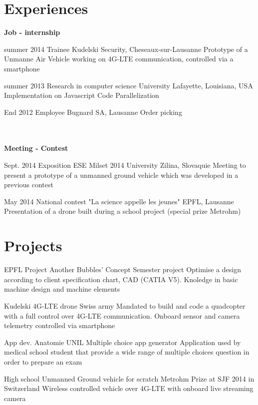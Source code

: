 \documentclass[]{friggeri-cv}
\begin{document}
	\section{Experiences}
	
	\textbf{Job - internship}%
	
	\begin{entrylist}
		
		\entry
		{summer 2014}
		{Trainee}
		{Kudelski Security, Cheseaux-sur-Lausanne}
		{Prototype of a Unmanne Air Vehicle working on 4G-LTE communication, controlled via a smartphone}
		
		\entry
		{summer 2013}
		{Research in computer science}
		{University Lafayette, Louisiana, USA}
		{Implementation on Javascript Code Parallelization}
		
		\entry
		{End 2012}
		{Employee}
		{Bugnard SA, Lausanne}
		{Order picking}
		
	\end{entrylist}
	\\ \\
	\textbf{Meeting - Contest} %
	
	\begin{entrylist}
		
		\entry
		{Sept. 2014}
		{Exposition ESE Milset 2014}
		{University Zilina, Slovaquie}
		{Meeting to present a prototype of a unmanned ground vehicle which was developed in a previous contest}
		
		\entry
		{May 2014}
		{National contest "La science appelle les jeunes"}
		{EPFL, Lausanne}
		{Presentation of a drone built during a school project (special prize Metrohm)}

	\end{entrylist}	
	\section{Projects}
	\begin{entrylist}
		\entry
		{EPFL Project}
		{Another Bubbles' Concept}
		{Semester project}
		{Optimise a design according to client specification chart, CAD (CATIA V5). Knoledge in basic machine design and machine elements}
		
		\entry
		{Kudelski}
		{4G-LTE drone}
		{Swiss army}
		{Mandated to build and code a quadcopter with a full control over 4G-LTE communication. Onboard sensor and camera telemetry controlled via smartphone}
		
		\entry
		{App dev.}
		{Anatomie UNIL}
		{Multiple choice app generator}
		{Application used by medical school student that provide a wide range of multiple choices question in order to prepare an exam}
		
		\entry
		{High school}
		{Unmanned Ground vehicle for scratch}
		{Metrohm Prize at SJF 2014 in Switzerland}
		{Wireless controlled vehicle over 4G-LTE with onboard live streaming camera}
	\end{entrylist}
	
\end{document}

